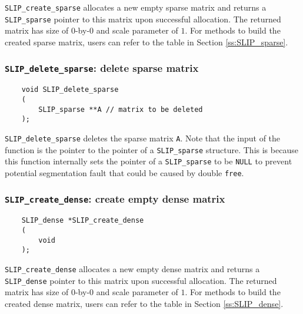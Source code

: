 \documentclass[12pt]{article}
\theoremstyle{definition}
\begin{document}
\verb|SLIP_create_sparse| allocates a new empty sparse matrix and returns a
\verb|SLIP_sparse| pointer to this matrix upon successful allocation.  The
returned matrix has size of $0$-by-$0$ and scale parameter of $1$. For methods
to build the created sparse matrix, users can refer to the table in Section
\ref{ss:SLIP_sparse}.

\cprotect\subsubsection{\verb|SLIP_delete_sparse|: delete sparse matrix}
\label{ss:delete_sparse}

\begin{mdframed}[userdefinedwidth=6in]
{\footnotesize
\begin{verbatim}
    void SLIP_delete_sparse
    (
        SLIP_sparse **A // matrix to be deleted
    );
\end{verbatim}
} \end{mdframed}

\verb|SLIP_delete_sparse| deletes the sparse matrix \verb|A|. Note that the
input of the function is the pointer to the pointer of a \verb|SLIP_sparse|
structure. This is because this function internally sets the pointer of a
\verb|SLIP_sparse| to be \verb|NULL| to prevent potential segmentation fault
that could be caused by double \verb|free|.

\cprotect\subsubsection{\verb|SLIP_create_dense|: create empty dense matrix}
\label{ss:create_dense}

\begin{mdframed}[userdefinedwidth=6in]
{\footnotesize
\begin{verbatim}
    SLIP_dense *SLIP_create_dense
    (
        void
    );
\end{verbatim}
} \end{mdframed}

\verb|SLIP_create_dense| allocates a new empty dense matrix and returns a
\verb|SLIP_dense| pointer to this matrix upon successful allocation. The
returned matrix has size of $0$-by-$0$ and scale parameter of $1$. For methods
to build the created dense matrix, users can refer to the table in Section
\ref{ss:SLIP_dense}.
\end{document}
